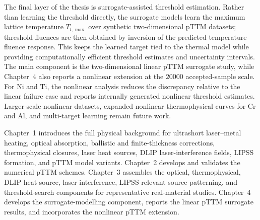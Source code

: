 The final layer of the thesis is surrogate-assisted threshold estimation. Rather than learning the threshold directly, the surrogate models learn the maximum lattice temperature \(T_{l,\max}\) over synthetic two-dimensional pTTM datasets; threshold fluences are then obtained by inversion of the predicted temperature--fluence response. This keeps the learned target tied to the thermal model while providing computationally efficient threshold estimates and uncertainty intervals. The main component is the two-dimensional linear pTTM surrogate study, while Chapter~4 also reports a nonlinear extension at the \(\num{20000}\) accepted-sample scale. For Ni and Ti, the nonlinear analysis reduces the discrepancy relative to the linear failure case and reports internally generated nonlinear threshold estimates. Larger-scale nonlinear datasets, expanded nonlinear thermophysical curves for Cr and Al, and multi-target learning remain future work.

Chapter~1 introduces the full physical background for ultrashort laser--metal heating, optical absorption, ballistic and finite-thickness corrections, thermophysical closures, laser heat sources, DLIP laser-interference fields, LIPSS formation, and pTTM model variants. Chapter~2 develops and validates the numerical pTTM schemes. Chapter~3 assembles the optical, thermophysical, DLIP heat-source, laser-interference, LIPSS-relevant source-patterning, and threshold-search components for representative real-material studies. Chapter~4 develops the surrogate-modelling component, reports the linear pTTM surrogate results, and incorporates the nonlinear pTTM extension.
